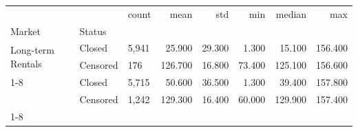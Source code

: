 \begin{tabular}{lllrrrrr}
\toprule
 &  & count & mean & std & min & median & max \\
Market & Status &  &  &  &  &  &  \\
\midrule
\multirow[t]{2}{*}{Long-term Rentals} & Closed & 5,941 & 25.900 & 29.300 & 1.300 & 15.100 & 156.400 \\
 & Censored & 176 & 126.700 & 16.800 & 73.400 & 125.100 & 156.600 \\
\cline{1-8}
\multirow[t]{2}{*}{Secondary Sales} & Closed & 5,715 & 50.600 & 36.500 & 1.300 & 39.400 & 157.800 \\
 & Censored & 1,242 & 129.300 & 16.400 & 60.000 & 129.900 & 157.400 \\
\cline{1-8}
\bottomrule
\end{tabular}
